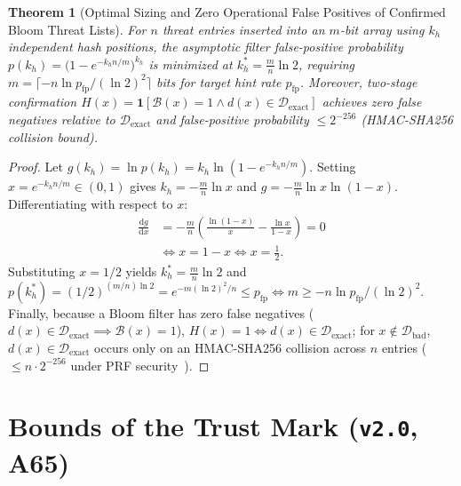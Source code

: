 \documentclass[10pt,twocolumn,letterpaper]{article}
\makeatletter
\theoremstyle{plain}
\newtheorem{theorem}{Theorem}[section]
\theoremstyle{definition}
\theoremstyle{remark}
\DeclareRobustCommand{\_}{\ifmmode\nfss@text{\textunderscore}\else\textunderscore\penalty\@highpenalty\hskip\z@skip\fi}
\makeatother
\begin{document}
\begin{theorem}[Optimal Sizing and Zero Operational False Positives of Confirmed Bloom Threat Lists]
\label{thm:bloom}
For $n$ threat entries inserted into an $m$-bit array using $k_h$ independent hash positions, the asymptotic filter false-positive probability $p(k_h) = \big(1 - e^{-k_h n / m}\big)^{k_h}$ is minimized at $k_h^* = \frac{m}{n}\ln 2$, requiring $m = \lceil -n \ln p_{\text{fp}} / (\ln 2)^2 \rceil$ bits for target hint rate $p_{\text{fp}}$. Moreover, two-stage confirmation $H(x) = \mathbf{1}[\mathcal{B}(x) = 1 \land d(x) \in \mathcal{D}_{\text{exact}}]$ achieves zero false negatives relative to $\mathcal{D}_{\text{exact}}$ and false-positive probability $\le 2^{-256}$ (HMAC-SHA256 collision bound).
\end{theorem}
\begin{proof}
Let $g(k_h) = \ln p(k_h) = k_h \ln(1 - e^{-k_h n / m})$. Setting $x = e^{-k_h n / m} \in (0, 1)$ gives $k_h = -\frac{m}{n}\ln x$ and $g = -\frac{m}{n}\ln x \ln(1 - x)$. Differentiating with respect to $x$:
\begin{align*}
  \frac{\mathrm{d}g}{\mathrm{d}x} &= -\frac{m}{n}\!\left(\frac{\ln(1 - x)}{x} - \frac{\ln x}{1 - x}\right) = 0\\
  &\iff x = 1 - x \iff x = \frac{1}{2}.
\end{align*}
Substituting $x = 1/2$ yields $k_h^* = \frac{m}{n}\ln 2$ and $p(k_h^*) = (1/2)^{(m/n)\ln 2} = e^{-m(\ln 2)^2 / n} \le p_{\text{fp}} \iff m \ge -n \ln p_{\text{fp}} / (\ln 2)^2$. Finally, because a Bloom filter has zero false negatives ($d(x) \in \mathcal{D}_{\text{exact}} \implies \mathcal{B}(x) = 1$), $H(x) = 1 \iff d(x) \in \mathcal{D}_{\text{exact}}$; for $x \notin \mathcal{D}_{\text{bad}}$, $d(x) \in \mathcal{D}_{\text{exact}}$ occurs only on an HMAC-SHA256 collision across $n$ entries ($\le n \cdot 2^{-256}$ under PRF security~\cite{bellare1996keying}).
\end{proof}

\section{Bounds of the Trust Mark (\texttt{v2.0}, A65)}
\label{app:trust}
\end{document}
